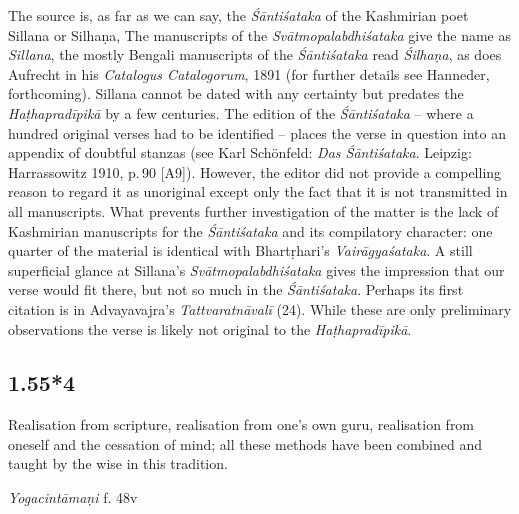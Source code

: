 \begin{ekdosis}
\begin{philcomm}[hp01_055_3]
The source is, as far as we can say, the \emph{Śāntiśataka} of the Kashmirian poet Sillana or Silhaṇa, The manuscripts of the \emph{Svātmopalabdhiśataka} give the name as \emph{Sillana}, the mostly Bengali manuscripts of the \emph{Śāntiśataka} read \emph{Śilhaṇa}, as does Aufrecht in his \emph{Catalogus Catalogorum}, 1891 (for further details see Hanneder, forthcoming). Sillana cannot be dated with any certainty but predates the \emph{Haṭhapradīpikā} by a few centuries. The
edition of the \emph{Śāntiśataka} – where a hundred original verses had to be identified – places the verse in question into an appendix of doubtful stanzas (see Karl Schönfeld: \emph{Das Śāntiśataka}. Leipzig: Harrassowitz 1910, p.\,90 [A9]). However, the editor did not provide a compelling reason to regard it as unoriginal except only the fact that it is not transmitted in all manuscripts. What prevents further investigation of the matter is the lack of Kashmirian manuscripts for the \emph{Śāntiśataka} and its compilatory character: one quarter of the material is identical with Bhartṛhari's \emph{Vairāgyaśataka}. A still superficial glance at Sillana's \emph{Svātmopalabdhiśataka} gives the impression that our verse would fit there, but not so much in the \emph{Śāntiśataka}. Perhaps its first citation is in Advayavajra’s \emph{Tattva\-ratnāvalī} (24). While
these are only preliminary observations the verse is likely not original to the \emph{Haṭhapradīpikā}.
\end{philcomm}

\subsection*{1.55*4}
\begin{translation}[hp01_055_4]
Realisation from scripture, realisation from one's own guru, realisation from oneself and the cessation of mind; all these methods have been combined and taught by the wise in this tradition.%
\end{translation}


\begin{testimonia}[hp01_055_4]
\emph{Yogacintāmaṇi} f. 48v

\begin{versinnote}
\end{versinnote}


\end{testimonia}
\end{ekdosis}
